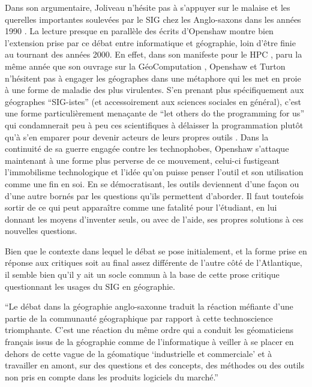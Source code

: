 Dans son argumentaire, Joliveau n'hésite pas à s'appuyer sur le malaise et les querelles importantes soulevées par le SIG chez les Anglo-saxons dans les années 1990 \autocite[472-473]{Joliveau2004}. La lecture presque en parallèle des écrits d'Openshaw montre bien l'extension prise par ce débat entre informatique et géographie, loin d'être finie au tournant des années 2000. En effet, dans son manifeste pour le HPC \autocite[2]{Openshaw2000}, paru la même année que son ouvrage sur la GéoComputation \autocite{Openshaw2000b}, Openshaw et Turton n’hésitent pas à engager les géographes dans une métaphore qui les met en proie à une forme de maladie des plus virulentes. S'en prenant plus spécifiquement aux géographes \enquote{SIG-istes} (et accessoirement aux sciences sociales en général), c’est une forme particulièrement menaçante de \foreignquote{english}{let others do the programming for us} qui condamnerait peu à peu ces scientifiques à délaisser la programmation plutôt qu’à s’en emparer pour devenir acteurs de leurs propres outils . Dans la continuité de sa guerre engagée contre les technophobes, Openshaw s'attaque  maintenant à une forme plus perverse de ce mouvement, celui-ci fustigeant l'immobilisme technologique et l'idée qu'on puisse penser l'outil et son utilisation comme une fin en soi. En se démocratisant, les outils deviennent d'une façon ou d'une autre bornés par les questions qu'ils permettent d'aborder. Il faut toutefois sortir de ce qui peut apparaître comme une fatalité pour l'étudiant, en lui donnant les moyens d'inventer seuls, ou avec de l'aide, ses propres solutions à ces nouvelles questions.

Bien que le contexte dans lequel le débat se pose initialement, et la forme prise en réponse aux critiques soit au final assez différente de l'autre côté de l'Atlantique, il semble bien qu'il y ait un socle commun à la base de cette prose critique questionnant les usages du SIG en géographie.

\enquote{Le débat dans la géographie anglo-saxonne traduit la réaction méfiante d'une partie de la communauté géographique par rapport à cette technoscience triomphante. C'est une réaction du même ordre qui a conduit les géomaticiens français issus de la géographie comme de l'informatique à veiller à se placer en dehors de cette vague de la géomatique \enquote{industrielle et commerciale} et à travailler en amont, sur des questions et des concepts, des méthodes ou des outils non pris en compte dans les produits logiciels du marché.}

